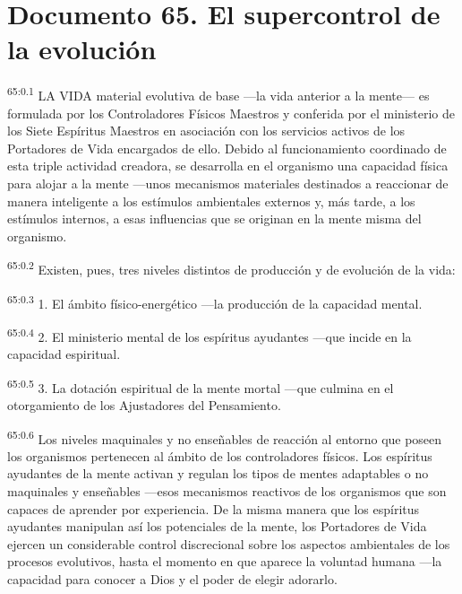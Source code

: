\chapter{Documento 65. El supercontrol de la evolución}
\par
\textsuperscript{65:0.1} LA VIDA material evolutiva de base ---la vida anterior a la mente--- es formulada por los Controladores Físicos Maestros y conferida por el ministerio de los Siete Espíritus Maestros en asociación con los servicios activos de los Portadores de Vida encargados de ello. Debido al funcionamiento coordinado de esta triple actividad creadora, se desarrolla en el organismo una capacidad física para alojar a la mente ---unos mecanismos materiales destinados a reaccionar de manera inteligente a los estímulos ambientales externos y, más tarde, a los estímulos internos, a esas influencias que se originan en la mente misma del organismo.

\par
\textsuperscript{65:0.2} Existen, pues, tres niveles distintos de producción y de evolución de la vida:

\par
\textsuperscript{65:0.3} 1. El ámbito físico-energético ---la producción de la capacidad mental.

\par
\textsuperscript{65:0.4} 2. El ministerio mental de los espíritus ayudantes ---que incide en la capacidad espiritual.

\par
\textsuperscript{65:0.5} 3. La dotación espiritual de la mente mortal ---que culmina en el otorgamiento de los Ajustadores del Pensamiento.

\par
\textsuperscript{65:0.6} Los niveles maquinales y no enseñables de reacción al entorno que poseen los organismos pertenecen al ámbito de los controladores físicos. Los espíritus ayudantes de la mente activan y regulan los tipos de mentes adaptables o no maquinales y enseñables ---esos mecanismos reactivos de los organismos que son capaces de aprender por experiencia. De la misma manera que los espíritus ayudantes manipulan así los potenciales de la mente, los Portadores de Vida ejercen un considerable control discrecional sobre los aspectos ambientales de los procesos evolutivos, hasta el momento en que aparece la voluntad humana ---la capacidad para conocer a Dios y el poder de elegir adorarlo.

